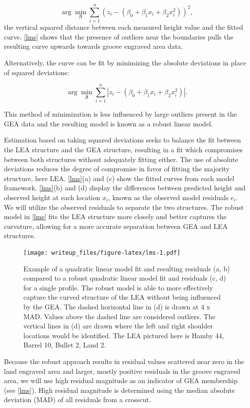 \documentclass[12pt]{article}
\begin{document}
\[\arg\min_{\mathbf{\beta}} \sum_{i=1}^n \left(z_i - (\beta_0 + \beta_1x_i + \beta_2x_i^2)\right)^2,\]
the vertical squared distance between each measured height value and the
fitted curve. \autoref{lms} shows that the presence of outliers near the
boundaries pulls the resulting curve upwards towards groove engraved
area data.

Alternatively, the curve can be fit by minimizing the absolute
deviations in place of squared deviations:

\[\arg\min_{\mathbf{\beta}} \sum_{i=1}^n \left|z_i - (\beta_0 + \beta_1x_i + \beta_2x_i^2) \right|.\]

This method of minimization is less influenced by large outliers present
in the GEA data and the resulting model is known as a robust linear
model.

Estimation based on taking squared deviations seeks to balance the fit
between the LEA structure and the GEA structure, resulting in a fit
which compromises between both structures without adequately fitting
either. The use of absolute deviations reduces the degree of compromise
in favor of fitting the majority structure, here LEA. \autoref{lms}(a)
and (c) show the fitted curves from each model framework.
\autoref{lms}(b) and (d) display the differences between predicted
height and observed height at each location \(x_i\), known as the
observed model residuals \(e_i\). We will utilize the observed residuals
to separate the two structures. The robust model in \autoref{lms} fits
the LEA structure more closely and better captures the curvature,
allowing for a more accurate separation between GEA and LEA structures.

\begin{figure}
\centering
\texttt{[image: writeup\_files/figure-latex/lms-1.pdf]}
\caption{\label{lms}Example of a quadratic linear model fit and
resulting residuals (a, b) compared to a robust quadratic linear model
fit and residuals (c, d) for a single profile. The robust model is able
to more effectively capture the curved structure of the LEA without
being influenced by the GEA. The dashed horizontal line in (d) is drawn
at 4 x MAD. Values above the dashed line are considered outliers. The
vertical lines in (d) are drawn where the left and right shoulder
locations would be identified. The LEA pictured here is Hamby 44, Barrel
10, Bullet 2, Land 2.}
\end{figure}

Because the robust approach results in residual values scattered near
zero in the land engraved area and larger, mostly positive residuals in
the groove engraved area, we will use high residual magnitude as an
indicator of GEA membership (see \autoref{lms}). High residual magnitude
is determined using the median absolute deviation (MAD) of all residuals
from a crosscut.
\end{document}
